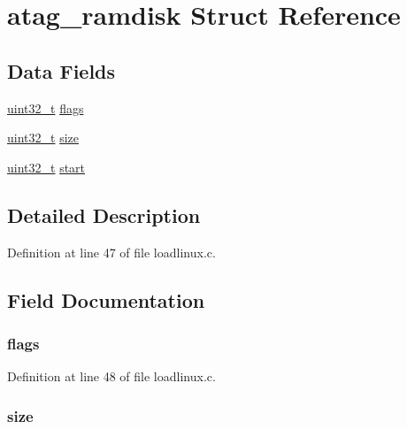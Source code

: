 \hypertarget{structatag__ramdisk}{\section{atag\-\_\-ramdisk \-Struct \-Reference}
\label{structatag__ramdisk}
}
\subsection*{\-Data \-Fields}
\begin{DoxyCompactItemize}
\item 
\hyperlink{arch__types_8h_a435d1572bf3f880d55459d9805097f62}{uint32\-\_\-t} \hyperlink{structatag__ramdisk_a773b39d480759f67926cb18ae2219281}{flags}
\item 
\hyperlink{arch__types_8h_a435d1572bf3f880d55459d9805097f62}{uint32\-\_\-t} \hyperlink{structatag__ramdisk_ab2c6b258f02add8fdf4cfc7c371dd772}{size}
\item 
\hyperlink{arch__types_8h_a435d1572bf3f880d55459d9805097f62}{uint32\-\_\-t} \hyperlink{structatag__ramdisk_a61eb63d26b2fa6c2971603ceccffb14b}{start}
\end{DoxyCompactItemize}


\subsection{\-Detailed \-Description}


\-Definition at line 47 of file loadlinux.\-c.



\subsection{\-Field \-Documentation}
\hypertarget{structatag__ramdisk_a773b39d480759f67926cb18ae2219281}{
\subsubsection[{flags}]{ {\bf flags}}}\label{structatag__ramdisk_a773b39d480759f67926cb18ae2219281}


\-Definition at line 48 of file loadlinux.\-c.

\hypertarget{structatag__ramdisk_ab2c6b258f02add8fdf4cfc7c371dd772}{
\subsubsection[{size}]{ {\bf size}}}\label{structatag__ramdisk_ab2c6b258f02add8fdf4cfc7c371dd772}


